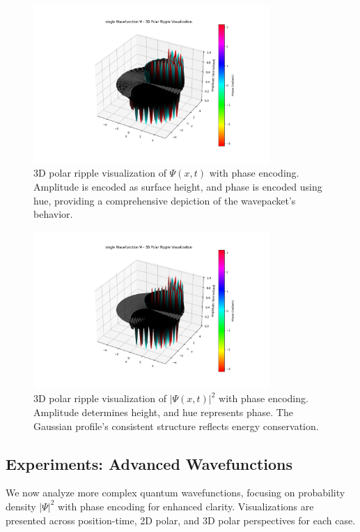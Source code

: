 \documentclass[12pt]{article}
\begin{document}
\begin{figure}[H]
    \centering
    \includegraphics[width=0.8\textwidth]{images/single_wavefunction_3d_polar_with_phase.png}
    \caption{3D polar ripple visualization of \(\Psi(x,t)\) with phase encoding. Amplitude is encoded as surface height, and phase is encoded using hue, providing a comprehensive depiction of the wavepacket's behavior.}
    \label{fig:single_3d_polar}
\end{figure}

\begin{figure}[H]
    \centering
    \includegraphics[width=0.8\textwidth]{images/single_wavefunction_3d_polar_probability_density_with_phase.png}
    \caption{3D polar ripple visualization of \(|\Psi(x,t)|^2\) with phase encoding. Amplitude determines height, and hue represents phase. The Gaussian profile's consistent structure reflects energy conservation.}
    \label{fig:single_3d_polar_density}
\end{figure}

\subsection{Experiments: Advanced Wavefunctions}
We now analyze more complex quantum wavefunctions, focusing on probability density \(|\Psi|^2\) with phase encoding for enhanced clarity. Visualizations are presented across position-time, 2D polar, and 3D polar perspectives for each case.
\end{document}
